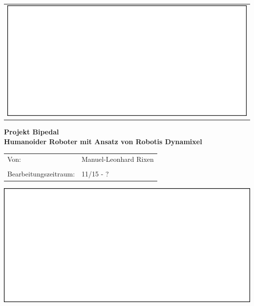 \begin{titlepage}
\hspace{9cm}
\begin{minipage}{1in}
\begin{tabular}{l}
\includegraphics[width=2\textwidth]{03_Grafiken/logo.jpg}
\end{tabular}
\end{minipage}
\begin{center}
\vfill
{ \huge \textbf{Projekt Bipedal} }\\[0.4cm]
{ \LARGE \textbf{Humanoider Roboter mit Ansatz von Robotis Dynamixel} }\\[0.4cm]
\end{center}
\begin{center}
\vfill
\begin{tabular}{p{5cm}l}
Von: & Manuel-Leonhard Rixen\\
&\\
Bearbeitungszeitraum: & 11/15 - ?
\end{tabular} 

\end{center}
\vfill
\begin{center}
%
%
\includegraphics[width=1.0\textwidth]{03_Grafiken/PseudoImage.jpg}
\vfill
\end{center}
\end{titlepage}